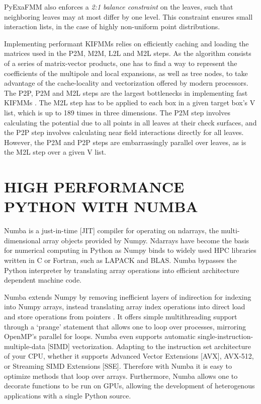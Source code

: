 \documentclass{IEEEcsmag}
\begin{document}
PyExaFMM also enforces a \textit{2:1 balance constraint} on the leaves, such that neighboring leaves may at most differ by one level. This constraint ensures small interaction lists, in the case of highly non-uniform point distributions.

Implementing performant KIFMMs relies on efficiently caching and loading the matrices used in the P2M, M2M, L2L and M2L steps. As the algorithm consists of a series of matrix-vector products, one has to find a way to represent the coefficients of the multipole and local expansions, as well as tree nodes, to take advantage of the cache-locality and vectorization offered by modern processors. The P2P, P2M and M2L steps are the largest bottlenecks in implementing fast KIFMMs \cite{Lashuk2012}. The M2L step has to be applied to each box in a given target box's V list, which is up to 189 times in three dimensions. The P2M step involves calculating the potential due to all points in all leaves at their check surfaces, and the P2P step involves calculating near field interactions directly for all leaves. However, the P2M and P2P steps are embarrassingly parallel over leaves, as is the M2L step over a given V list.

\section{HIGH PERFORMANCE PYTHON WITH NUMBA}

Numba is a just-in-time [JIT] compiler for operating on ndarrays, the multi-dimensional array objects provided by Numpy. Ndarrays have become the basis for numerical computing in Python as Numpy binds to widely used HPC libraries written in C or Fortran, such as LAPACK and BLAS. Numba bypasses the Python interpreter by translating array operations into efficient architecture dependent machine code.

Numba extends Numpy by removing inefficient layers of indirection for indexing into Numpy arrays, instead translating array index operations into direct load and store operations from pointers \cite{Lam2015}. It offers simple multithreading support through a `prange' statement that allows one to loop over processes, mirroring OpenMP's parallel for loops. Numba even supports automatic single-instruction-multiple-data [SIMD] vectorization. Adapting to the instruction set architecture of your CPU, whether it supports Advanced Vector Extensions [AVX], AVX-512, or  Streaming SIMD Extensions [SSE]. Therefore with Numba it is easy to optimize methods that loop over arrays. Furthermore, Numba allows one to decorate functions to be run on GPUs, allowing the development of heterogenous applications with a single Python source.
\end{document}
